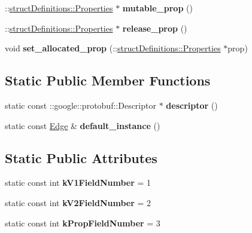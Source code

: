 \begin{DoxyCompactItemize}
\item 
\hypertarget{classstruct_definitions_1_1_edge_af982707fd9d1b376f91174679ae04b2d}{}\label{classstruct_definitions_1_1_edge_af982707fd9d1b376f91174679ae04b2d} 
\+::\hyperlink{classstruct_definitions_1_1_properties}{struct\+Definitions\+::\+Properties} $\ast$ {\bfseries mutable\+\_\+prop} ()
\item 
\hypertarget{classstruct_definitions_1_1_edge_ae3e6f66b1da8f91dbfc821cce794c13c}{}\label{classstruct_definitions_1_1_edge_ae3e6f66b1da8f91dbfc821cce794c13c} 
\+::\hyperlink{classstruct_definitions_1_1_properties}{struct\+Definitions\+::\+Properties} $\ast$ {\bfseries release\+\_\+prop} ()
\item 
\hypertarget{classstruct_definitions_1_1_edge_a40bca97fc59f14249ac884ed96c6eaa9}{}\label{classstruct_definitions_1_1_edge_a40bca97fc59f14249ac884ed96c6eaa9} 
void {\bfseries set\+\_\+allocated\+\_\+prop} (\+::\hyperlink{classstruct_definitions_1_1_properties}{struct\+Definitions\+::\+Properties} $\ast$prop)
\end{DoxyCompactItemize}
\subsection*{Static Public Member Functions}
\begin{DoxyCompactItemize}
\item 
\hypertarget{classstruct_definitions_1_1_edge_ad73f0c2e9b1fa9f21c371fcf5bd94ce2}{}\label{classstruct_definitions_1_1_edge_ad73f0c2e9b1fa9f21c371fcf5bd94ce2} 
static const \+::google\+::protobuf\+::\+Descriptor $\ast$ {\bfseries descriptor} ()
\item 
\hypertarget{classstruct_definitions_1_1_edge_aa56f783ba903ec57ce574a83f0c71dc0}{}\label{classstruct_definitions_1_1_edge_aa56f783ba903ec57ce574a83f0c71dc0} 
static const \hyperlink{classstruct_definitions_1_1_edge}{Edge} \& {\bfseries default\+\_\+instance} ()
\end{DoxyCompactItemize}
\subsection*{Static Public Attributes}
\begin{DoxyCompactItemize}
\item 
\hypertarget{classstruct_definitions_1_1_edge_a825a1d0808667ad0c17958921494870c}{}\label{classstruct_definitions_1_1_edge_a825a1d0808667ad0c17958921494870c} 
static const int {\bfseries k\+V1\+Field\+Number} = 1
\item 
\hypertarget{classstruct_definitions_1_1_edge_a9794b2361c5a6cd6812a435e69385f2e}{}\label{classstruct_definitions_1_1_edge_a9794b2361c5a6cd6812a435e69385f2e} 
static const int {\bfseries k\+V2\+Field\+Number} = 2
\item 
\hypertarget{classstruct_definitions_1_1_edge_adb9372f67608784179728612ce7ce5b7}{}\label{classstruct_definitions_1_1_edge_adb9372f67608784179728612ce7ce5b7} 
static const int {\bfseries k\+Prop\+Field\+Number} = 3
\end{DoxyCompactItemize}
